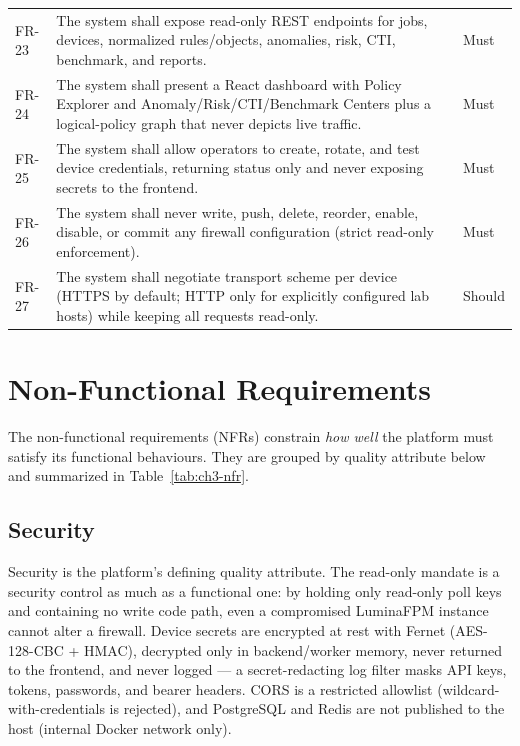 \documentclass[12pt,a4paper]{report}
\renewcommand{\_}{\textunderscore\allowbreak}
\newcommand{\hrow}{}
\newcommand{\altrow}{}
\begin{document}
\begin{longtable}{C{0.08\textwidth} L{0.70\textwidth} C{0.12\textwidth}}
\hrow FR-23 & The system shall expose read-only REST endpoints for jobs, devices, normalized rules/objects, anomalies, risk, CTI, benchmark, and reports. & Must \\
\altrow FR-24 & The system shall present a React dashboard with Policy Explorer and Anomaly/Risk/CTI/Benchmark Centers plus a logical-policy graph that never depicts live traffic. & Must \\
\hrow FR-25 & The system shall allow operators to create, rotate, and test device credentials, returning status only and never exposing secrets to the frontend. & Must \\
\altrow FR-26 & The system shall never write, push, delete, reorder, enable, disable, or commit any firewall configuration (strict read-only enforcement). & Must \\
\hrow FR-27 & The system shall negotiate transport scheme per device (HTTPS by default; HTTP only for explicitly configured lab hosts) while keeping all requests read-only. & Should \\
\end{longtable}

\section{Non-Functional Requirements}
\label{sec:ch3-nonfunctional}

The non-functional requirements (NFRs) constrain \emph{how well} the platform must satisfy its functional behaviours. They are grouped by quality attribute below and summarized in Table~\ref{tab:ch3-nfr}.

\subsection{Security}
\label{sec:ch3-nfr-security}
Security is the platform's defining quality attribute. The read-only mandate is a security control as much as a functional one: by holding only read-only poll keys and containing no write code path, even a compromised LuminaFPM instance cannot alter a firewall. Device secrets are encrypted at rest with Fernet (AES-128-CBC + HMAC), decrypted only in backend/worker memory, never returned to the frontend, and never logged — a secret-redacting log filter masks API keys, tokens, passwords, and bearer headers. CORS is a restricted allowlist (wildcard-with-credentials is rejected), and PostgreSQL and Redis are not published to the host (internal Docker network only).
\end{document}
